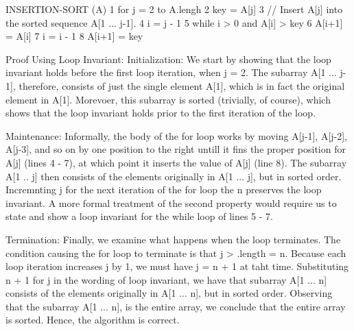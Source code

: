 INSERTION-SORT (A)
1 for j = 2 to A.lengh
2  key = A[j]
3   // Insert A[j] into the sorted sequence A[1 ... j-1].
4   i = j - 1
5   while i > 0 and A[i] > key
6     A[i+1] = A[i]
7     i = i - 1
8   A[i+1] = key

Proof Using Loop Invariant:
  Initialization: We start by showing that the loop invariant holds before the first loop iteration, when j = 2. The subarray A[1 ... j-1], therefore, consists of just the single element A[1], which is in fact the original element in A[1]. Morevoer, this subarray is sorted (trivially, of course), which shows that the loop invariant holds prior to the first iteration of the loop.
  
  Maintenance: Informally, the body of the for loop works by moving A[j-1], A[j-2], A[j-3], and so on by one position to the right untill it fins the proper position for A[j] (lines 4 - 7), at which point it inserts the value of A[j] (line 8). The subarray A[1 .. j] then consists of the elements originally in A[1 ... j], but in sorted order. Incremnting j for the next iteration of the for loop the n preserves the loop invariant.
    A more formal treatment of the second property would require us to state and show a loop invariant for the while loop of lines 5 - 7.
  
  Termination: Finally, we examine what happens when the loop terminates. The condition causing the for loop to terminate is that j > .length = n. Because each loop iteration increases j by 1, we must have j = n + 1 at taht time. Substituting n + 1 for j in the wording of loop invariant, we have that subarray A[1 ... n] consists of the elements originally in A[1 ... n], but in sorted order. Observing that the subarray A[1 ... n], is the entire array, we conclude that the entire array is sorted. Hence, the algorithm is correct.
  
